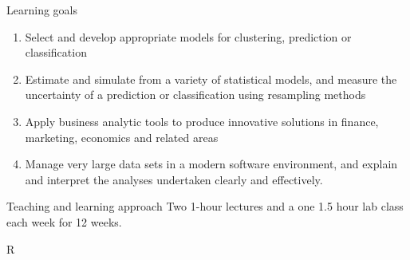 \documentclass[14pt]{beamer}
\begin{document}
\begin{frame}{Learning goals}\fontsize{13}{14}\sf

\begin{enumerate}
\item Select and develop appropriate models for clustering, prediction or classification
\item Estimate and simulate from a variety of statistical models, and measure the uncertainty of a prediction or classification using resampling methods
\item Apply business analytic tools to produce innovative solutions in finance, marketing, economics and related areas
\item Manage very large data sets in a modern software environment, and explain and interpret the analyses undertaken clearly and effectively.
\end{enumerate}

\pause

\begin{alertblock}{Teaching and learning approach}
Two 1-hour lectures and a one 1.5 hour lab class each week for 12 weeks.
\end{alertblock}
\end{frame}

\begin{frame}{R}
 


\end{frame}
\end{document}
